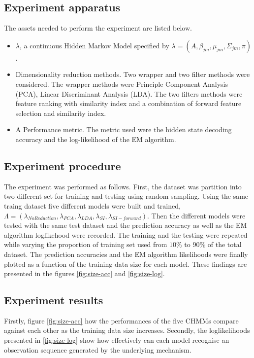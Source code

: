 \subsection{Experiment apparatus}
The assets needed to perform the experiment are listed below.
\begin{itemize}
	\item \(\lambda\), a continuous Hidden Markov Model specified by \(\lambda = (A, \beta_{jm}, \mu_{jm}, \Sigma_{jm}, \pi)\).
	\item Dimensionality reduction methods. Two wrapper and two filter methods were considered. The wrapper methods were Principle Component Analysis (PCA), Linear Discriminant Analysis (LDA). The two filters methods were feature ranking with similarity index %
	and a combination of forward feature selection and similarity index.
	\item A Performance metric. The metric used were the hidden state decoding accuracy and the log-likelihood of the EM algorithm.
\end{itemize}

\subsection{Experiment procedure}
The experiment was performed as follows.
First, the dataset was partition into two different set for training and testing using random sampling.
Using the same traing dataset five different models were built and trained, \(\Lambda = (\lambda_{No Reduction}, \lambda_{PCA}, \lambda_{LDA}, \lambda_{SI}, \lambda_{SI-forward})\).
Then the different models were tested with the same test dataset and the prediction accuracy as well as the EM algorithm loglikehood were recorded.
The training and the testing were repeated while varying the proportion of training set used from \(10\%\) to \(90\%\) of the total dataset.
The prediction accuracies and the EM algorithm likelihoods were finally plotted as a function of the training data size for each model.
These findings are presented in the figures \ref{fig:size-acc} and \ref{fig:size-log}. 

\subsection{Experiment results}
Firstly, figure \ref{fig:size-acc} how the performances of the five CHMMs compare against each other as the training data size increases.
Secondly, the loglikelihoods presented in \ref{fig:size-log} show how effectively can each model recognise an observation sequence generated by the underlying mechanism.


